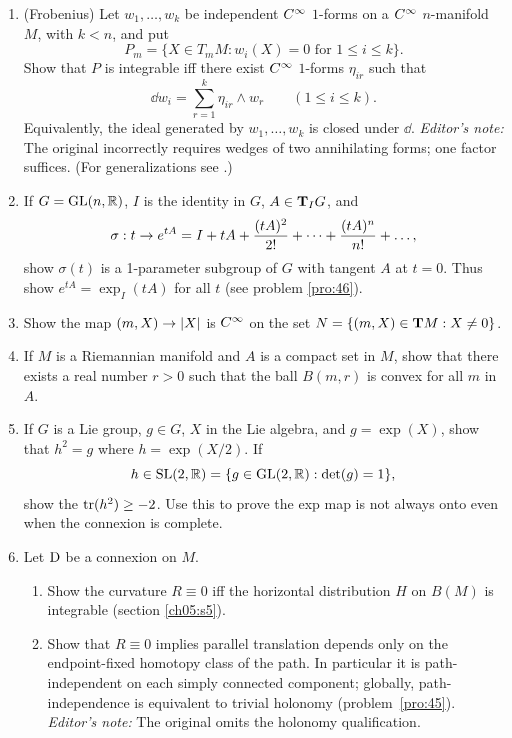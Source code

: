 \documentclass[../main]{subfiles}
\begin{document}
\begin{enumerate}
    \item\label{pro:80}(Frobenius) Let $w_1,\dots,w_k$ be independent $\CInfty$ $1$-forms on a $\CInfty$ $n$-manifold $M$, with $k<n$, and put \[P_m=\{X\in T_mM:w_i(X)=0\text{ for }1\leq i\leq k\}.\] Show that $P$ is integrable iff there exist $\CInfty$ $1$-forms $\eta_{ir}$ such that \[\dd w_i=\sum_{r=1}^k\eta_{ir}\wedge w_r\qquad(1\leq i\leq k).\] Equivalently, the ideal generated by $w_1,\dots,w_k$ is closed under $\dd$. \emph{Editor's note:} The original incorrectly requires wedges of two annihilating forms; one factor suffices. (For generalizations see \cite{kuranishi1957on,johnson1960terminating}.)
    \item\label{pro:81} If $G = \mathrm{GL}(n,\bR)$, $I$ is the identity in $G$, $A\in \tangentspace{G}{I}$, and \[\sigma: t\functionMaps e^{tA} = I + tA + \dfrac{(tA)^2}{2!} + \dots + \dfrac{(tA)^n}{n!} + \dots,\] show $\sigma(t)$ is a 1-parameter subgroup of $G$ with tangent $A$ at $t=0$. Thus show $e^{tA} = \exp_{I} (tA)$ for all $t$ (see problem \ref{pro:46}).
    \item\label{pro:82} Show the map $(m, X)\functionMaps \norm{X}$ is $\CInfty$ on the set \newline $N = \{(m,X) \in \tangentbundle{M}: X\neq 0\}$.
    \item\label{pro:83} If $M$ is a Riemannian manifold and $A$ is a compact set in $M$, show that there exists a real number $r>0$ such that the ball $B(m,r)$ is convex for all $m$ in $A$.
    \item\label{pro:84} If $G$ is a Lie group, $g\in G$, $X$ in the Lie algebra, and $g = \exp(X)$, show that $h^2=g$ where $h = \exp(X/2)$. If \[h\in\mathrm{SL}(2,\bR) = \{g\in \mathrm{GL}(2,\bR):\det(g) = 1\},\] show the $\tr(h^2) \ge -2$. Use this to prove the exp map is not always onto even when the connexion is complete. 
    \item\label{pro:85} Let $\connection$ be a connexion on $M$. 
    \begin{enumerate}[label=(\roman*)]
        \item Show the curvature $R\equiv 0$ iff the horizontal distribution $H$ on $B(M)$ is integrable (section \ref{ch05:s5}).
        \item Show that $R\equiv0$ implies parallel translation depends only on the endpoint-fixed homotopy class of the path. In particular it is path-independent on each simply connected component; globally, path-independence is equivalent to trivial holonomy (problem~\ref{pro:45}). \emph{Editor's note:} The original omits the holonomy qualification.
    \end{enumerate}
    

\end{enumerate}
\end{document}
